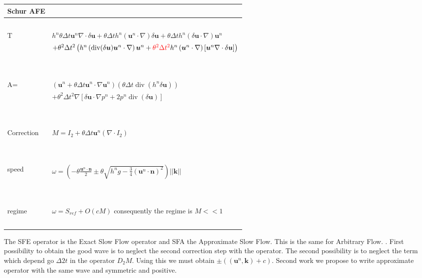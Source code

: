 \documentclass[a4paper, 11pt]{article}
\begin{document}
\begin{table}
\begin{tabular}{|l|l|}
  \hline
  Schur AFE &  \\
  \hline
  ~ & ~\\
  T &  $h^n\theta\Delta t\boldsymbol{u}^n\nabla \cdot \delta \boldsymbol{u}+\theta\Delta th^n\left(\boldsymbol{u}^n\cdot \nabla \right)\delta \boldsymbol{u}+\theta\Delta th^n\left(\delta \boldsymbol{u}\cdot \nabla\right)\boldsymbol{u}^n$\\
&$+\theta^2\Delta t^2 \left( h^n\left(\text{div}(\delta \boldsymbol{u})\boldsymbol{u}^n\cdot \nabla\right)\boldsymbol{u}^n+\textcolor{red}{\theta^2\Delta t^2}h^n\left(\boldsymbol{u}^n\cdot \nabla\right)\left[\boldsymbol{u}^n\nabla \cdot \delta \boldsymbol{u}\right]\right)$ \\ 
  ~ & ~\\
    \hline
      ~& ~\\ 
  A= &$\left(\boldsymbol{u}^n+\theta \Delta t \boldsymbol{u}^n\cdot \nabla \boldsymbol{u}^n \right)\left(\theta \Delta t \operatorname{div}(h^n \delta \boldsymbol{u})\right) $\\
  ~&$+\theta^2 \Delta t^2 \nabla\left[ \delta \boldsymbol{u}\cdot \nabla p^n + 2p^n \operatorname{div}(\delta \boldsymbol{u}) \right] $\\
  ~ & ~\\
      \hline
     ~ &~ \\
   Correction &  $M=I_2+\theta\Delta t\boldsymbol{u}^n(\nabla\cdot I_2)$ \\ 
   ~ & ~\\
    \hline
     ~ &~ \\
  speed & $\omega=\left(-\theta\frac{\boldsymbol{u}^n\cdot \boldsymbol{n}}{2}\pm\theta\sqrt{h^n g-\frac{3}{4}(\boldsymbol{u}^n\cdot\boldsymbol{n})^2}\right)||\boldsymbol{k}||$  \\ 
   ~ & ~\\
    \hline
    ~& ~\\
  regime & $\omega=S_{ref}+O(cM)$ consequently the regime is $M<< 1$\\
   ~& ~\\
    \hline
\end{tabular}
\end{table}

The SFE operator is the Exact Slow Flow operator and SFA the Approximate Slow Flow. This is the same for Arbitrary Flow. \textcolor{We assume that we can modify the AFA operator to obtain good wave}. First possibility to obtain the good wave is to neglect the second correction step with the operator. The second possibility is to neglect the term which depend go $\Delta 2 t$ in the operator $D_2 M$. Using this we must obtain $\pm \left((\boldsymbol{u}^n,\boldsymbol{k})+c\right)$. Second work we propose to write approximate operator with the same wave and symmetric and positive. 
\end{document}
